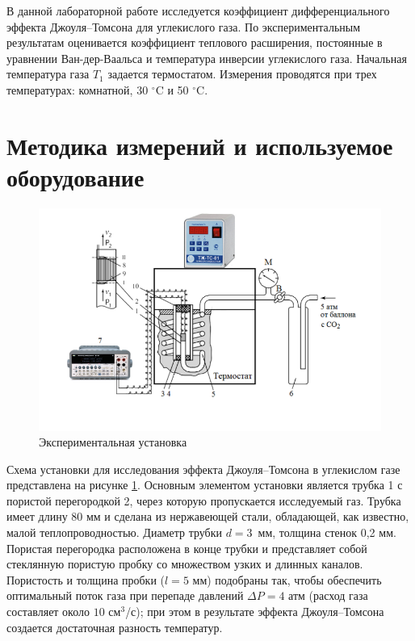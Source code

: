 \documentclass[a4paper, 12pt]{article}
\begin{document}
    \noindent В данной лабораторной работе исследуется коэффициент дифференциального эффекта Джоуля–Томсона для углекислого газа. По экспериментальным результатам оценивается коэффициент теплового расширения, постоянные в уравнении Ван-дер-Ваальса и температура инверсии углекислого газа. Начальная температура газа $T_1$ задается термостатом. Измерения проводятся при трех температурах: комнатной, 30 $ ^\circ $C и 50 $^\circ $C.

    \section*{Методика измерений и используемое оборудование}

    \begin{figure}[H]
        \centering
        \includegraphics[width=18cm]{images/installation.png}
        \caption{Экспериментальная установка}
        \label{ust}
    \end{figure}
    
    \noindent Схема установки для исследования эффекта Джоуля–Томсона в углекислом газе представлена на рисунке \ref{ust}. Основным элементом установки является трубка 1 с пористой перегородкой 2, через которую пропускается исследуемый газ. Трубка имеет длину 80 мм и сделана из нержавеющей стали, обладающей, как известно, малой теплопроводностью. Диаметр трубки $d = 3$~мм, толщина стенок 0,2 мм. Пористая перегородка расположена в конце трубки и представляет собой стеклянную пористую пробку со множеством узких и длинных каналов. Пористость и толщина пробки ($l = 5$ мм) подобраны так, чтобы обеспечить оптимальный поток газа при перепаде давлений $\Delta P = 4$ атм (расход газа составляет около $10$ см$^3$/с); при этом в результате эффекта Джоуля–Томсона создается достаточная разность температур.\\
\end{document}
